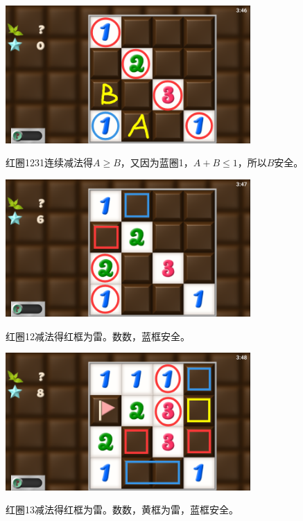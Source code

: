 \subsection{} %
\begin{center}
    \includegraphics[width=0.7\textwidth]{puzzle/162-1.png}
\end{center}
红圈1231连续减法得$A\ge B$，又因为蓝圈1，$A+B\le 1$，所以$B$安全。
\begin{center}
    \includegraphics[width=0.7\textwidth]{puzzle/162-2.png}
\end{center}
红圈12减法得红框为雷。数数，蓝框安全。
\begin{center}
    \includegraphics[width=0.7\textwidth]{puzzle/162-3.png}
\end{center}
红圈13减法得红框为雷。数数，黄框为雷，蓝框安全。

